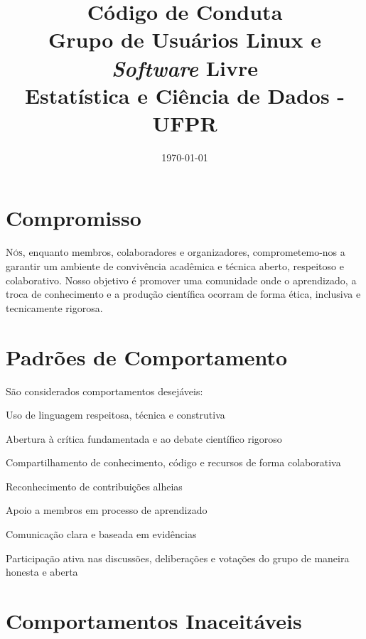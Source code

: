 \documentclass[
  12pt,          %
  a4paper,       %
  oneside,       %
  brazil         %
]{article}
\title{Código de Conduta\\[0.3em]
  \Large\mdseries\color{gulecdGray}%
  Grupo de Usuários Linux e \textit{Software} Livre\\Estatística e Ciência de Dados - UFPR}
\date{\today}
\begin{document}
\thispagestyle{empty}
\maketitle

\newpage

\section{Compromisso}

\lettrine[lines=3, lhang=0.1, nindent=0em, slope=-0.5em]{N}{ós}, enquanto membros, colaboradores e organizadores, comprometemo-nos a 
garantir um ambiente de convivência acadêmica e técnica aberto, respeitoso e colaborativo. Nosso objetivo é promover uma comunidade onde o 
aprendizado, a troca de conhecimento e a produção científica ocorram de forma ética, inclusiva e tecnicamente rigorosa.

\section{Padrões de Comportamento}

São considerados comportamentos desejáveis:

\begin{conduta}
  \item Uso de linguagem respeitosa, técnica e construtiva
  \item Abertura à crítica fundamentada e ao debate científico rigoroso
  \item Compartilhamento de conhecimento, código e recursos de forma colaborativa
  \item Reconhecimento de contribuições alheias
  \item Apoio a membros em processo de aprendizado
  \item Comunicação clara e baseada em evidências
  \item Participação ativa nas discussões, deliberações e votações do grupo de maneira honesta e aberta
\end{conduta}

\section{Comportamentos Inaceitáveis}
\end{document}
